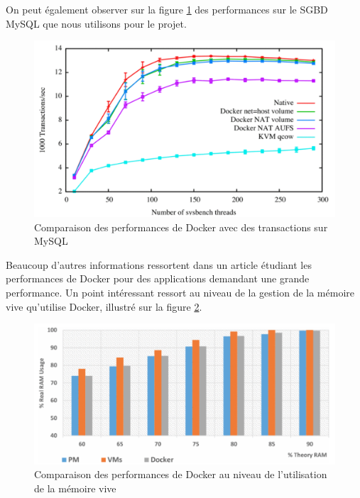 \documentclass[
    iai, %
    il, %
]{heig-tb}
\begin{document}
On peut également observer sur la figure \ref{docker-perf-mysql} des performances sur le SGBD MySQL
que nous utilisons pour le projet.

\begin{center}
    \begin{figure}
        \includegraphics[width=\textwidth]{./assets/figures/docker-perf-mysql.png}
        \caption[Comparaison des perf. Docker sur MySQ]{Comparaison des performances de Docker avec des
            transactions sur MySQL \cite{felter} \label{docker-perf-mysql}}
    \end{figure}
\end{center}

Beaucoup d'autres informations ressortent dans un article étudiant les performances de Docker pour
des applications demandant une grande performance. \cite{chung}
Un point intéressant ressort au niveau de la gestion de la mémoire vive qu'utilise Docker, illustré
sur la figure \ref{docker-perf-ram}.

\begin{center}
    \begin{figure}
        \includegraphics[width=\textwidth]{./assets/figures/docker-perf-ram.png}
        \caption[Comparaison des perf. Docker sur la RAM]{Comparaison des performances de Docker au
            niveau de l'utilisation de la mémoire vive \cite{chung} \label{docker-perf-ram}}
    \end{figure}
\end{center}
\end{document}
